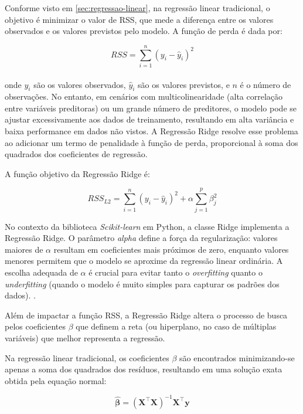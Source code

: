 Conforme visto em \ref{sec:regressao-linear}, na regressão linear tradicional, o objetivo é minimizar o valor de \gls{RSS}, que mede a diferença entre os valores observados e os valores previstos pelo modelo. A função de perda é dada por:

\begin{equation}
	RSS = \sum_{i=1}^{n} (y_i - \hat{y}_i)^2
\end{equation}
\\

\noindent onde $y_i$ são os valores observados, $\hat{y}_i$ são os valores previstos, e $n$ é o número de observações. No entanto, em cenários com multicolinearidade (alta correlação entre variáveis preditoras) ou um grande número de preditores, o modelo pode se ajustar excessivamente aos dados de treinamento, resultando em alta variância e baixa performance em dados não vistos. A Regressão Ridge resolve esse problema ao adicionar um termo de penalidade à função de perda, proporcional à soma dos quadrados dos coeficientes de regressão. 

A função objetivo da Regressão Ridge é:

\begin{equation}
	RSS_{L2} = \sum_{i=1}^{n} (y_i - \hat{y}_i)^2 + \alpha \sum_{j=1}^{p} \beta_j^2
\end{equation}

No contexto da biblioteca \textit{Scikit-learn} em Python, a classe Ridge implementa a Regressão Ridge. O parâmetro \textit{alpha} define a força da regularização: valores maiores de $\alpha$ resultam em coeficientes mais próximos de zero, enquanto valores menores permitem que o modelo se aproxime da regressão linear ordinária. A escolha adequada de 
$\alpha$ é crucial para evitar tanto o \textit{overfitting} quanto o \textit{underfitting} (quando o modelo é muito simples para capturar os padrões dos dados). \cite{ScikitLearnRidge2025}.

Além de impactar a função RSS, a Regressão Ridge altera o processo de busca pelos coeficientes $\beta$ que definem a reta (ou hiperplano, no caso de múltiplas variáveis) que melhor representa a regressão.

Na regressão linear tradicional, os coeficientes $\beta$ são encontrados minimizando-se apenas a soma dos quadrados dos resíduos, resultando em uma solução exata obtida pela equação normal:

\begin{equation}
	\hat{\boldsymbol\beta} = (\mathbf{X}^\top \mathbf{X})^{-1} \mathbf{X}^\top \mathbf{y}
\end{equation}

